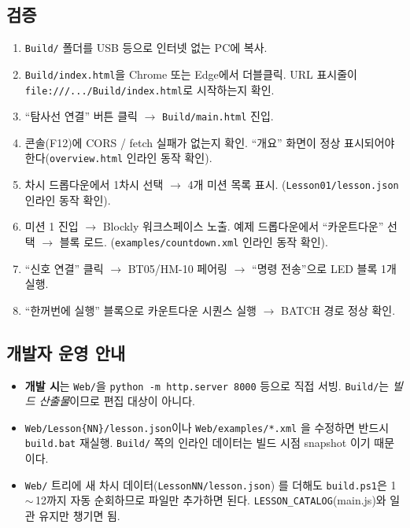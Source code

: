 \documentclass[11pt, oneside]{article}
\begin{document}
\subsection{검증}

\begin{enumerate}
  \item \texttt{Build/} 폴더를 USB 등으로 인터넷 없는 PC에 복사.
  \item \texttt{Build/index.html}을 Chrome 또는 Edge에서 더블클릭.
        URL 표시줄이 \texttt{file:///.../Build/index.html}로 시작하는지 확인.
  \item ``탐사선 연결'' 버튼 클릭 $\to$ \texttt{Build/main.html} 진입.
  \item 콘솔(F12)에 CORS / fetch 실패가 없는지 확인. ``개요'' 화면이
        정상 표시되어야 한다(\texttt{overview.html} 인라인 동작 확인).
  \item 차시 드롭다운에서 1차시 선택 $\to$ 4개 미션 목록 표시.
        (\texttt{Lesson01/lesson.json} 인라인 동작 확인).
  \item 미션 1 진입 $\to$ Blockly 워크스페이스 노출. 예제 드롭다운에서
        ``카운트다운'' 선택 $\to$ 블록 로드. (\texttt{examples/countdown.xml}
        인라인 동작 확인).
  \item ``신호 연결'' 클릭 $\to$ BT05/HM-10 페어링 $\to$ ``명령 전송''으로
        LED 블록 1개 실행.
  \item ``한꺼번에 실행'' 블록으로 카운트다운 시퀀스 실행 $\to$ BATCH
        경로 정상 확인.
\end{enumerate}

\subsection{개발자 운영 안내}

\begin{itemize}
  \item \textbf{개발 시}는 \texttt{Web/}을 \texttt{python -m http.server 8000}
        등으로 직접 서빙. \texttt{Build/}는 \emph{빌드 산출물}이므로
        편집 대상이 아니다.
  \item \texttt{Web/Lesson\{NN\}/lesson.json}이나 \texttt{Web/examples/*.xml}
        을 수정하면 반드시 \texttt{build.bat} 재실행. \texttt{Build/}
        쪽의 인라인 데이터는 빌드 시점 snapshot 이기 때문이다.
  \item \texttt{Web/} 트리에 새 차시 데이터(\texttt{LessonNN/lesson.json})
        를 더해도 \texttt{build.ps1}은 1\,$\sim$\,12까지 자동 순회하므로
        파일만 추가하면 된다. \texttt{LESSON\_CATALOG}(main.js)와 일관
        유지만 챙기면 됨.
\end{itemize}
\end{document}
